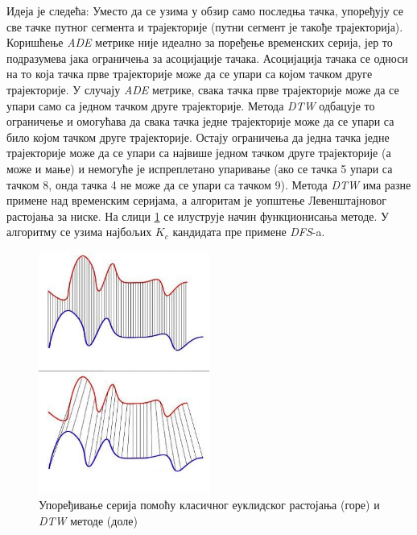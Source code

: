 \documentclass[11pt,oneside]{memoir}
\begin{document}
Идеја је следећа: Уместо да се узима у обзир само последња тачка, упоређују се све тачке путног сегмента и трајекторије 
(путни сегмент је такође трајекторија). Коришћење \textit{ADE} метрике није идеално за поређење временских серија, јер 
то подразумева јака ограничења за асоцијације тачака. Асоцијација тачака се односи на то која тачка прве трајекторије може 
да се упари са којом тачком друге трајекторије. У случају \textit{ADE} метрике, свака тачка прве трајекторије
може да се упари само са једном тачком друге трајекторије. Метода \textit{DTW} одбацује то ограничење и омогућава
да свака тачка једне трајекторије може да се упари са било којом тачком друге трајекторије. Остају ограничења да једна
тачка једне трајекторије може да се упари са највише једном тачком друге трајекторије (а може и мање) и 
немогуће је испреплетано упаривање (ако се тачка 5 упари са тачком 8, онда тачка 4 не може да се упари са тачком 9). Метода
\textit{DTW} има разне примене над временским серијама, а алгоритам је уопштење Левенштајновог растојања за ниске. На слици
\ref{euclidean_vs_dtw} се илуструје начин функционисања методе. У алгоритму се узима најбољих $K_c$ кандидата пре примене 
\textit{DFS}-a.

\begin{figure}[H]
  \centering
  \includegraphics[width=0.5\textwidth]{images/Euclidean_vs_DTW.jpg}
  \caption{Упоређивање серија помоћу класичног еуклидског растојања (горе) и \textit{DTW} методе (доле)}
  \label{euclidean_vs_dtw}
\end{figure}
\end{document}
